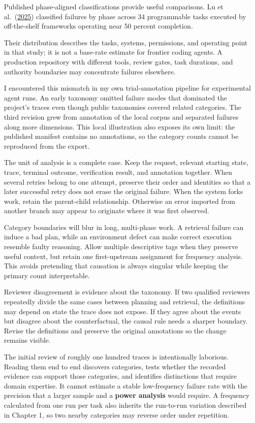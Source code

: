 Published phase-aligned classifications provide useful comparisons. Lu et al.~(\href{https://arxiv.org/abs/2508.13143}{2025}) classified failures by phase across 34 programmable tasks executed by off-the-shelf frameworks operating near 50 percent completion.

Their distribution describes the tasks, systems, permissions, and operating point in that study; it is not a base-rate estimate for frontier coding agents. A production repository with different tools, review gates, task durations, and authority boundaries may concentrate failures elsewhere.

I encountered this mismatch in my own trial-annotation pipeline for experimental agent runs. An early taxonomy omitted failure modes that dominated the project's traces even though public taxonomies covered related categories. The third revision grew from annotation of the local corpus and separated failures along more dimensions. This local illustration also exposes its own limit: the published manifest contains no annotations, so the category counts cannot be reproduced from the export.

The unit of analysis is a complete case. Keep the request, relevant starting state, trace, terminal outcome, verification result, and annotation together. When several retries belong to one attempt, preserve their order and identities so that a later successful retry does not erase the original failure. When the system forks work, retain the parent-child relationship. Otherwise an error imported from another branch may appear to originate where it was first observed.

Category boundaries will blur in long, multi-phase work. A retrieval failure can induce a bad plan, while an environment defect can make correct execution resemble faulty reasoning. Allow multiple descriptive tags when they preserve useful context, but retain one first-upstream assignment for frequency analysis. This avoids pretending that causation is always singular while keeping the primary count interpretable.

Reviewer disagreement is evidence about the taxonomy. If two qualified reviewers repeatedly divide the same cases between planning and retrieval, the definitions may depend on state the trace does not expose. If they agree about the events but disagree about the counterfactual, the causal rule needs a sharper boundary. Revise the definitions and preserve the original annotations so the change remains visible.

The initial review of roughly one hundred traces is intentionally laborious. Reading them end to end discovers categories, tests whether the recorded evidence can support those categories, and identifies distinctions that require domain expertise. It cannot estimate a stable low-frequency failure rate with the precision that a larger sample and a \textbf{power analysis} would require. A frequency calculated from one run per task also inherits the run-to-run variation described in Chapter 1, so two nearby categories may reverse order under repetition.

